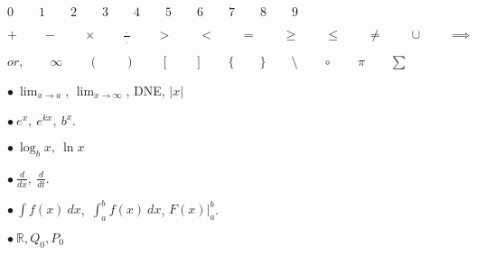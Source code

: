 \documentclass[14pt,a4paper]{extarticle}
\newcommand{\ds}{\displaystyle}
\begin{document}
\thispagestyle{fancy}

$0 \qquad 1 \qquad 2 \qquad 3 \qquad 4 \qquad 5 \qquad 6 \qquad 7 \qquad 8 \qquad 9$

\vspace*{2em}

 $\ds + \qquad - \qquad \times \qquad \frac{~.~}{~.~} \qquad > \qquad < \qquad = \qquad \geq \qquad  \leq \qquad \neq \qquad \cup \qquad \implies \qquad $

\vspace*{2em} 
$ or, \qquad \infty \qquad ( \qquad ) \qquad [ \qquad ] \qquad\{ \qquad \} \qquad \setminus \qquad \circ \qquad \pi \qquad \sum $

\vspace*{2em}
 $\bullet\  \ds \lim_{x\to a}$, $\ds \lim_{x\to \infty}$, DNE, $|x|$

\vspace*{2em}
 $\bullet\  \ds e^{x},~e^{kx},~ b^x$. \quad 

\vspace*{2em}
 $\bullet\  \ds\log_{b}{x},\  \ln {x}$ \quad 

\vspace*{2em}
 $\bullet\  \ds \frac{d}{dx}, ~ \frac{d}{dt}$.

\vspace*{2em}
 $\bullet\ \ds \int f(x)\ dx$,~$\ds \int_a^b f(x)\ dx$, $\ds F(x)\Big|_a^b$.

\vspace*{2em}
$\bullet \ \ds \mathbb{R}, {Q_0}, P_0$
\end{document}
